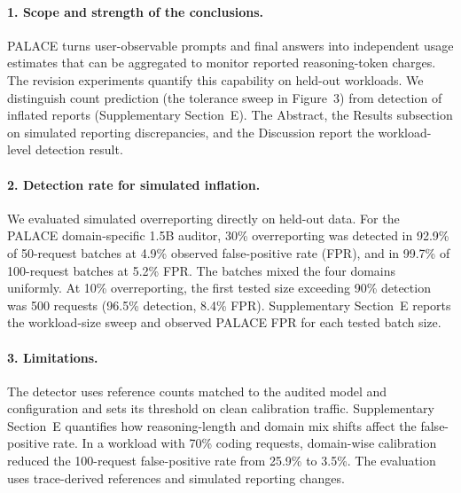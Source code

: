 \documentclass[11pt,letterpaper]{article}
\begin{document}
\paragraph{1. Scope and strength of the conclusions.}
PALACE turns user-observable prompts and final answers into independent usage estimates that can be aggregated to monitor reported reasoning-token charges. The revision experiments quantify this capability on held-out workloads. We distinguish count prediction (the tolerance sweep in Figure~3) from detection of inflated reports (Supplementary Section~E). The Abstract, the Results subsection on simulated reporting discrepancies, and the Discussion report the workload-level detection result.

\paragraph{2. Detection rate for simulated inflation.}
We evaluated simulated overreporting directly on held-out data. For the PALACE domain-specific 1.5B auditor, 30\% overreporting was detected in 92.9\% of 50-request batches at 4.9\% observed false-positive rate (FPR), and in 99.7\% of 100-request batches at 5.2\% FPR. The batches mixed the four domains uniformly. At 10\% overreporting, the first tested size exceeding 90\% detection was 500 requests (96.5\% detection, 8.4\% FPR). Supplementary Section~E reports the workload-size sweep and observed PALACE FPR for each tested batch size.

\paragraph{3. Limitations.}
The detector uses reference counts matched to the audited model and configuration and sets its threshold on clean calibration traffic. Supplementary Section~E quantifies how reasoning-length and domain mix shifts affect the false-positive rate. In a workload with 70\% coding requests, domain-wise calibration reduced the 100-request false-positive rate from 25.9\% to 3.5\%. The evaluation uses trace-derived references and simulated reporting changes.
\end{document}
